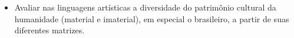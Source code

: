 

\begin{itemize}
\item Avaliar nas linguagens artísticas a diversidade do patrimônio cultural
da humanidade (material e imaterial), em especial o brasileiro, a partir
de suas diferentes matrizes.
\end{itemize}

